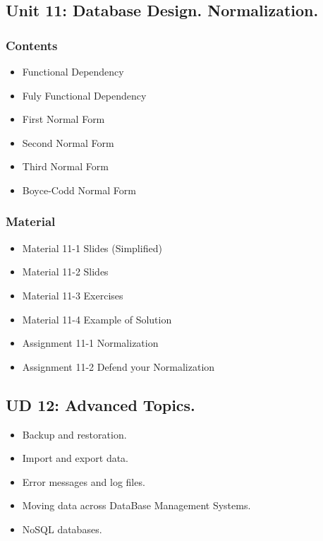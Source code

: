 \documentclass[catalan, a4paper, 12pt, titlepage]{article}
\begin{document}
  \subsection{Unit 11: Database Design. Normalization.}

  \subsubsection{Contents}
  \begin{itemize}
	\item Functional Dependency
	\item Fuly Functional Dependency
	\item First Normal Form
	\item Second Normal Form
	\item Third Normal Form
	\item Boyce-Codd Normal Form
  \end{itemize}

  \subsubsection{Material}
  \begin{itemize}
	  \item Material 11-1 Slides (Simplified)
	  \item Material 11-2 Slides
	  \item Material 11-3 Exercises
	  \item Material 11-4 Example of Solution
	  \item Assignment 11-1 Normalization
	  \item Assignment 11-2 Defend your Normalization
  \end{itemize}


  \subsection{UD 12: Advanced Topics.}

  \begin{itemize}
	\item Backup and restoration.
	\item Import and export data.
	\item Error messages and log files.
	\item Moving data across DataBase Management Systems.
	\item NoSQL databases.
  \end{itemize}
\end{document}
